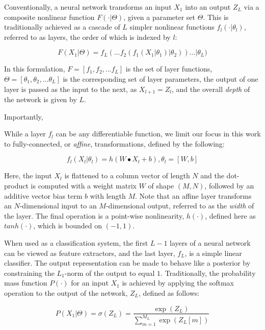 Conventionally, a neural network transforms an input $X_{1}$ into an output $Z_{L}$ via a composite nonlinear function $F(\cdot \vert \Theta)$, given a parameter set $\Theta$.
This is traditionally achieved as a cascade of $L$ simpler nonlinear functions $f_l(\cdot \vert \theta_l)$, referred to as layers, the order of which is indexed by $l$:

\begin{equation}
\label{eq:layers}
F(X_{1} \vert \Theta) = f_{L}(  ... f_2(f_1(X_{1} \vert \theta_1) \vert \theta_2) ) ... \vert \theta_{L})
\end{equation}

\noindent In this formulation, $F = [f_1, f_2, ... f_{L} ]$ is the set of layer functions, $\Theta = [\theta_1, \theta_2, ... \theta_{L} ]$ is the corresponding set of layer parameters, the output of one layer is passed as the input to the next, as $X_{l+1} = Z_{l}$, and the overall \emph{depth} of the network is given by $L$.

Importantly,

While a layer $f_l$ can be any differentiable function, we limit our focus in this work to fully-connected, or \emph{affine}, transformations, defined by the following:

\begin{equation}
\label{eq:fclayer}
f_l(X_l \vert \theta_l) = h( W \bullet X_{l} + b), \theta_l = [W, b]
\end{equation}

\noindent Here, the input $X_l$ is flattened to a column vector of length $N$ and the dot-product is computed with a weight matrix $W$ of shape $(M, N)$, followed by an additive vector bias term $b$ with length $M$.
Note that an affine layer transforms an $N$-dimensional input to an $M$-dimensional output, referred to as the \emph{width} of the layer.
The final operation is a point-wise nonlinearity, $h(\cdot)$, defined here as $tanh(\cdot)$, which is bounded on $(-1, 1)$.

When used as a classification system, the first $L-1$ layers of a neural network can be viewed as feature extractors, and the last layer, $f_L$, is a simple linear classifier.
The output representation can be made to behave like a posterior by constraining the $L_1$-norm of the output to equal $1$.
Traditionally, the probability mass function $P(\cdot)$ for an input $X_1$ is achieved by applying the softmax operation to the output of the network, $Z_L$, defined as follows:

\begin{equation}
\label{eq:softmax}
P(X_1 | \Theta) = \sigma(Z_L) = \frac{\exp(Z_{L})}{ \sum_{m=1}^{M_{L}}\exp{(Z_{L}[m])}}
\end{equation}

